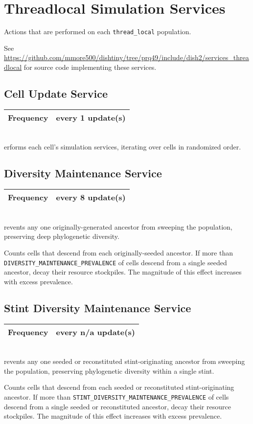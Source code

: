 \newcommand{\threadlocalsimservicedef}[2]{
    \begin{tabular}{|
        >{\columncolor[HTML]{C0C0C0}}l |l|}
        \hline
        Frequency & every #1 update(s) \\ \hline
    \end{tabular} \\
}

\section{Threadlocal Simulation Services}

Actions that are performed on each \texttt{thread\_local} population.

See \url{https://github.com/mmore500/dishtiny/tree/prq49/include/dish2/services_threadlocal} for source code implementing these services.

\subsection{Cell Update Service}

\threadlocalsimservicedef{1}

Performs each cell's simulation services, iterating over cells in randomized order.

\subsection{Diversity Maintenance Service}

\threadlocalsimservicedef{8}

Prevents any one originally-generated ancestor from sweeping the population, preserving deep phylogenetic diversity.

Counts cells that descend from each originally-seeded ancestor.
If more than \texttt{DIVERSITY\_MAINTENANCE\_PREVALENCE} of cells descend from a single seeded ancestor, decay their resource stockpiles.
The magnitude of this effect increases with excess prevalence.

\subsection{Stint Diversity Maintenance Service}

\threadlocalsimservicedef{n/a}

Prevents any one seeded or reconstituted stint-originating ancestor from sweeping the population, preserving phylogenetic diversity within a single stint.

Counts cells that descend from each seeded or reconstituted stint-originating ancestor.
If more than \texttt{STINT\_DIVERSITY\_MAINTENANCE\_PREVALENCE} of cells descend from a single seeded or reconstituted ancestor, decay their resource stockpiles.
The magnitude of this effect increases with excess prevalence.
